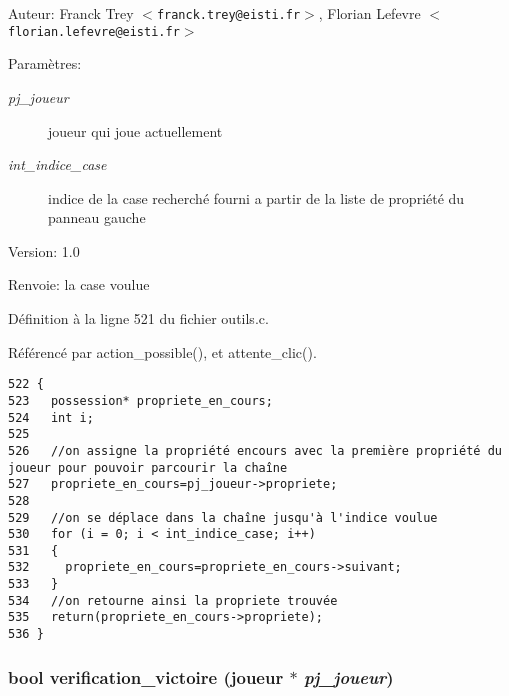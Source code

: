 \begin{Desc}
\item[Auteur:]Franck Trey $<${\tt franck.trey@eisti.fr}$>$, Florian Lefevre $<${\tt florian.lefevre@eisti.fr}$>$\end{Desc}
\begin{Desc}
\item[Param\`{e}tres:]
\begin{description}
\item[{\em pj\_\-joueur}]joueur qui joue actuellement \item[{\em int\_\-indice\_\-case}]indice de la case recherch\'{e} fourni a partir de la liste de propri\'{e}t\'{e} du panneau gauche\end{description}
\end{Desc}
\begin{Desc}
\item[Version:]1.0 \end{Desc}
\begin{Desc}
\item[Renvoie:]la case voulue \end{Desc}


D\'{e}finition \`{a} la ligne 521 du fichier outils.c.

R\'{e}f\'{e}renc\'{e} par action\_\-possible(), et attente\_\-clic().

\begin{Code}\begin{verbatim}522 {
523   possession* propriete_en_cours;
524   int i;
525   
526   //on assigne la propriété encours avec la première propriété du joueur pour pouvoir parcourir la chaîne
527   propriete_en_cours=pj_joueur->propriete;
528   
529   //on se déplace dans la chaîne jusqu'à l'indice voulue
530   for (i = 0; i < int_indice_case; i++)
531   {
532     propriete_en_cours=propriete_en_cours->suivant;
533   }
534   //on retourne ainsi la propriete trouvée
535   return(propriete_en_cours->propriete);
536 }
\end{verbatim}\end{Code}


\subsubsection{\setlength{\rightskip}{0pt plus 5cm}bool verification\_\-victoire ({\bf joueur} $\ast$ {\em pj\_\-joueur})}\label{outils_8c_f24e5d6a3c8482c890219439e48dfe74}


